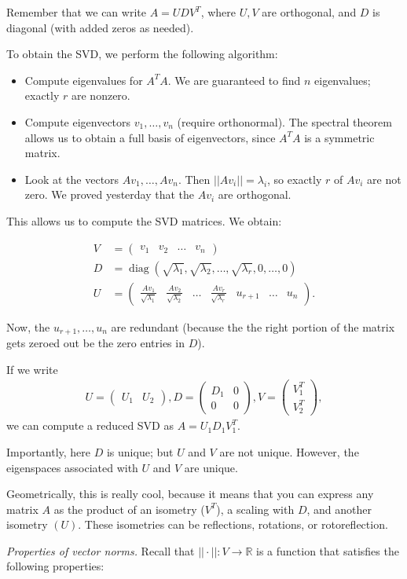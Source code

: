 \documentclass{article}
\newcommand{\mat}[1]{\begin{pmatrix}#1\end{pmatrix}}
\newcommand{\RR}{\mathbb{R}}
\DeclareMathOperator{\diag}{diag}
\begin{document}
Remember that we can write $A = U D V^T$, where $U, V$ are orthogonal, and $D$ is diagonal (with added zeros as needed).

To obtain the SVD, we perform the following algorithm:

\begin{itemize}
  \item Compute eigenvalues for $A^T A$.  We are guaranteed to find $n$ eigenvalues; exactly $r$ are nonzero.
  \item Compute eigenvectors $v_1, \dots, v_n$ (require orthonormal).  The spectral theorem allows us to obtain a full basis of eigenvectors, since $A^T A$ is a symmetric matrix.
  \item Look at the vectors $Av_1, \dots, Av_n$.  Then $||A v_i|| = \lambda_i$, so exactly $r$ of $Av_i$ are not zero.  We proved yesterday that the $Av_i$ are orthogonal.
\end{itemize}

This allows us to compute the SVD matrices.  We obtain:

\begin{align*}
 V &= \mat{v_1 & v_2 & \dots & v_n} \\
 D &= \diag(\sqrt{\lambda_1}, \sqrt{\lambda_2}, \dots, \sqrt{\lambda_r}, 0, \dots, 0) \\
 U &= \mat{\frac{Av_1}{\sqrt{\lambda_1}} & \frac{A v_2}{\sqrt{\lambda_2}} & \dots & \frac{A v_r}{\sqrt{\lambda_r}} & u_{r+1} & \dots & u_n}.
\end{align*}

Now, the $u_{r+1}, \dots, u_{n}$ are redundant (because the the right portion of the matrix gets zeroed out be the zero entries in $D$).

If we write
\begin{align*}
  U = \mat{U_1 & U_2}, D = \mat{D_1 & 0 \\ 0 & 0}, V = \mat{V_1^T \\ V_2^T},
\end{align*}
we can compute a reduced SVD as $A = U_1 D_1 V_1^T$.

Importantly, here $D$ is unique; but $U$ and $V$ are not unique.  However, the eigenspaces associated with $U$ and $V$ are unique.

Geometrically, this is really cool, because it means that you can express any matrix $A$ as the product of an isometry ($V^T$), a scaling with $D$, and another isometry $(U)$.  These isometries can be reflections, rotations, or rotoreflection.

{\it Properties of vector norms.} Recall that $|| \cdot || : V \to \RR$ is a function that satisfies the following properties:
\end{document}
